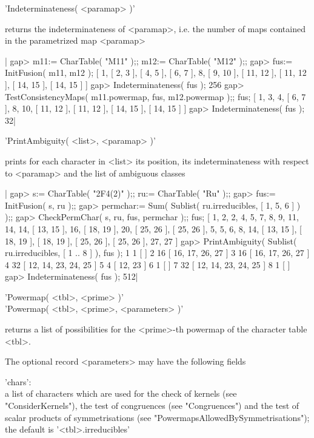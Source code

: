 'Indeterminateness( <paramap> )'

returns the indeterminateness of <paramap>, i.e. the number of maps contained
in the parametrized map <paramap>

|    gap> m11:= CharTable( "M11" );; m12:= CharTable( "M12" );;
    gap> fus:= InitFusion( m11, m12 );
    [ 1, [ 2, 3 ], [ 4, 5 ], [ 6, 7 ], 8, [ 9, 10 ], [ 11, 12 ],
      [ 11, 12 ], [ 14, 15 ], [ 14, 15 ] ]
    gap> Indeterminateness( fus );
    256
    gap> TestConsistencyMaps( m11.powermap, fus, m12.powermap );; fus;
    [ 1, 3, 4, [ 6, 7 ], 8, 10, [ 11, 12 ], [ 11, 12 ], [ 14, 15 ],
      [ 14, 15 ] ]
    gap> Indeterminateness( fus );
    32|


'PrintAmbiguity( <list>, <paramap> )'

prints for each character in <list> its position, its indeterminateness
with respect to <paramap> and the list of ambiguous classes

|    gap> s:= CharTable( "2F4(2)" );; ru:= CharTable( "Ru" );;
    gap> fus:= InitFusion( s, ru );;
    gap> permchar:= Sum( Sublist( ru.irreducibles, [ 1, 5, 6 ] ) );;
    gap> CheckPermChar( s, ru, fus, permchar );; fus;
    [ 1, 2, 2, 4, 5, 7, 8, 9, 11, 14, 14, [ 13, 15 ], 16, [ 18, 19 ], 20, 
      [ 25, 26 ], [ 25, 26 ], 5, 5, 6, 8, 14, [ 13, 15 ], [ 18, 19 ],
      [ 18, 19 ], [ 25, 26 ], [ 25, 26 ], 27, 27 ]
    gap> PrintAmbiguity( Sublist( ru.irreducibles, [ 1 .. 8 ] ), fus );
    1 1 [  ]
    2 16 [ 16, 17, 26, 27 ]
    3 16 [ 16, 17, 26, 27 ]
    4 32 [ 12, 14, 23, 24, 25 ]
    5 4 [ 12, 23 ]
    6 1 [  ]
    7 32 [ 12, 14, 23, 24, 25 ]
    8 1 [  ]
    gap> Indeterminateness( fus );
    512|
    

'Powermap( <tbl>, <prime> )'\\
'Powermap( <tbl>, <prime>, <parameters> )'

returns a list of possibilities for the <prime>-th powermap of the
character table <tbl>.

The optional record <parameters> may have the following fields\:

'chars':\\
     a list of characters which are used for the check of kernels
     (see "ConsiderKernels"), the test of congruences (see "Congruences")
     and the test of scalar products of symmetrisations
     (see "PowermapsAllowedBySymmetrisations");
     the default is '<tbl>.irreducibles'

